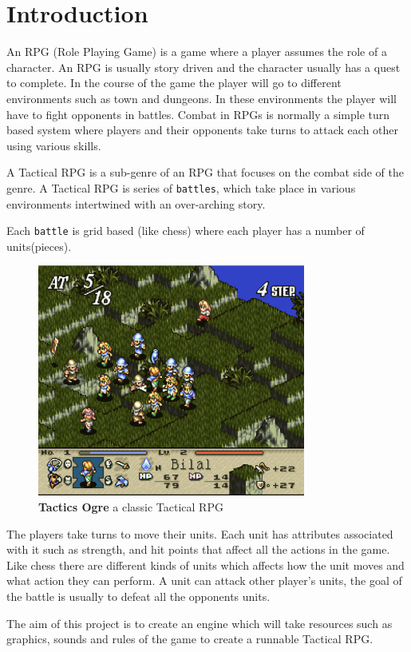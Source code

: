 \section{Introduction} 
\label{introduction}
       
An RPG (Role Playing Game) is a game where a player assumes the role of a character. An RPG is usually story driven and the character usually has a quest to complete. In the course of the game the player will go to different environments such as town and dungeons. In these environments the player will have to fight opponents in battles. Combat in RPGs is normally a simple turn based system where players and their opponents take turns to attack each other using various skills. 

A Tactical RPG is a sub-genre of an RPG that focuses on the combat side of the genre. A Tactical RPG is series of \texttt{battles}, which take place in various environments intertwined with an over-arching story.

Each \texttt{battle} is grid based (like chess) where each player has a number of units(pieces). 
\begin{figure}[htbp] \centering 
	\includegraphics[height=3in]{figures/TRPG.png} 
	\caption{\textbf{Tactics Ogre}\cite{to} a classic Tactical RPG } 
	\label{fig:TRPG} 
\end{figure}
The players take turns to move their units. Each unit has attributes associated with it such as strength, and hit points that affect all the actions in the game. Like chess there are different kinds of units which affects how the unit moves and what action they can perform. A unit can attack other player's units, the goal of the battle is usually to defeat all the opponents units.

The aim of this project is to create an engine which will take resources such as graphics, sounds and rules of the game to create a runnable Tactical RPG.

